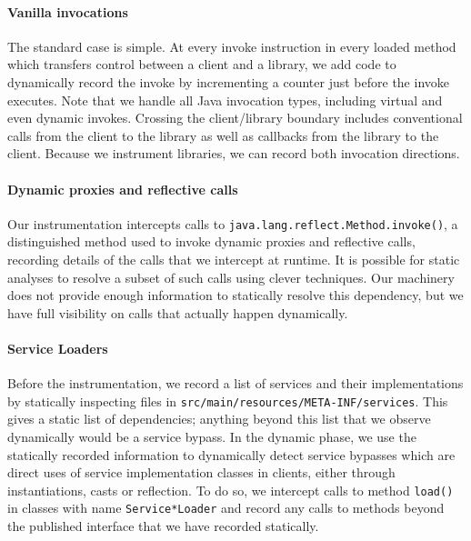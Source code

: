 \paragraph{Vanilla invocations} 
The standard case is simple. At every invoke instruction in every
loaded method which transfers control between a client and a
library, we add code to dynamically record
the invoke by incrementing a counter just before the invoke
executes. Note that we handle all Java invocation types, including
virtual and even dynamic invokes. Crossing the client/library boundary
includes conventional calls from the client to the library as well as
callbacks from the library to the client.  Because we instrument
libraries, we can record both invocation directions.

\paragraph{Dynamic proxies and reflective calls}
Our instrumentation intercepts calls to
\texttt{java.lang.reflect.Method.invoke()}, a distinguished method
used to invoke dynamic proxies and reflective calls, 
recording details of the calls that we intercept at runtime. It is possible for
static analyses to resolve a subset of such calls using clever
techniques. Our machinery does not provide enough information to
statically resolve this dependency, but we have full visibility on
calls that actually happen dynamically.

\paragraph{Service Loaders} Before the instrumentation, we record a list 
of services and their implementations by statically inspecting files in \texttt{src/main/resources/META-INF/services}. 
This gives a static list of dependencies; anything beyond this list that we observe dynamically would be a service bypass. 
In the dynamic phase, we use the statically recorded information to dynamically detect service bypasses which are direct uses of service implementation 
classes in clients, either through instantiations, casts or reflection. To do so, we intercept calls 
to method \texttt{load()} in classes with name \texttt{Service*Loader} and record any calls to methods beyond 
the published interface that we have recorded statically.

